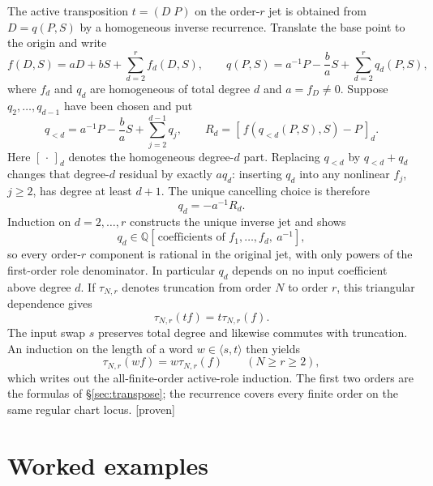 \documentclass[11pt]{article}
\newcommand{\Proven}{\textsf{[proven]}}
\theoremstyle{plain}
\theoremstyle{definition}
\begin{document}
The active transposition $t=(D\;P)$ on the order-$r$ jet is obtained from $D=q(P,S)$ by a homogeneous
inverse recurrence.  Translate the base point to the origin and write
\[
f(D,S)=aD+bS+\sum_{d=2}^{r}f_d(D,S),
\qquad
q(P,S)=a^{-1}P-\frac baS+\sum_{d=2}^{r}q_d(P,S),
\]
where $f_d$ and $q_d$ are homogeneous of total degree $d$ and $a=f_D\ne0$.  Suppose
$q_2,\ldots,q_{d-1}$ have been chosen and put
\[
q_{<d}=a^{-1}P-\frac baS+\sum_{j=2}^{d-1}q_j,
\qquad
R_d=[\,f(q_{<d}(P,S),S)-P\,]_d .
\]
Here $[\,\cdot\,]_d$ denotes the homogeneous degree-$d$ part.  Replacing $q_{<d}$ by
$q_{<d}+q_d$ changes that degree-$d$ residual by exactly $a q_d$: inserting $q_d$ into any nonlinear
$f_j$, $j\ge2$, has degree at least $d+1$.  The unique cancelling choice is therefore
\[
q_d=-a^{-1}R_d.
\]
Induction on $d=2,\ldots,r$ constructs the unique inverse jet and shows
\[
q_d\in\mathbb Q[\,\text{coefficients of }f_1,\ldots,f_d,\ a^{-1}],
\]
so every order-$r$ component is rational in the original jet, with only powers of the first-order role
denominator.  In particular $q_d$ depends on no input coefficient above degree $d$.  If
$\tau_{N,r}$ denotes truncation from order $N$ to order $r$, this triangular dependence gives
\[
\tau_{N,r}(t f)=t\tau_{N,r}(f).
\]
The input swap $s$ preserves total degree and likewise commutes with truncation.  An induction on the
length of a word $w\in\langle s,t\rangle$ then yields
\[
\tau_{N,r}(w f)=w\tau_{N,r}(f)
\qquad(N\ge r\ge2),
\]
which writes out the all-finite-order active-role induction.  The first two orders are the formulas of
\S\ref{sec:transpose}; the recurrence covers every finite order on the same regular chart locus.
\Proven

\section{Worked examples}
\label{app:examples}
\end{document}
